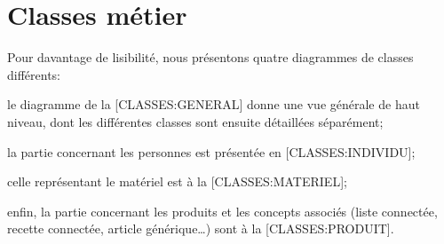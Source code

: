 \chapter{Classes métier}

Pour davantage de lisibilité, nous présentons quatre diagrammes de classes différents:
\startitemize
\item le diagramme de la [CLASSES:GENERAL] donne une vue générale de haut niveau, dont les différentes classes sont ensuite détaillées séparément;
\item la partie concernant les personnes est présentée en [CLASSES:INDIVIDU];
\item celle représentant le matériel est à la [CLASSES:MATERIEL];
\item enfin, la partie concernant les produits et les concepts associés (liste connectée, recette connectée, article générique\dots) sont à la [CLASSES:PRODUIT].
\stopitemize

{}

{}

{}

{}

